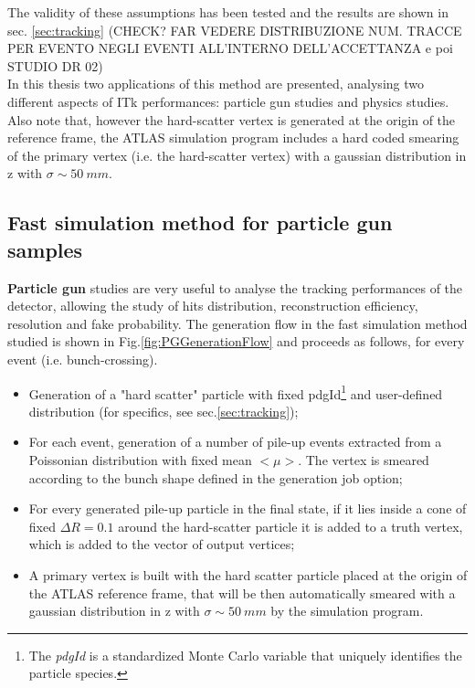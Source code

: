 \documentclass[a4paper,twoside,12pt]{article}
\begin{document}
The validity of these assumptions has been tested and the results are shown in sec.
\ref{sec:tracking} (CHECK? FAR VEDERE DISTRIBUZIONE NUM. TRACCE PER EVENTO 
NEGLI EVENTI ALL'INTERNO DELL'ACCETTANZA e poi STUDIO DR 02)\\

In this thesis two applications of this method are presented, analysing two different aspects
of ITk performances: particle gun studies and physics studies. \\

Also note that, however the hard-scatter vertex is generated at the origin of the reference
frame, the ATLAS simulation program includes a hard coded smearing of the primary vertex
(i.e. the hard-scatter vertex) with a gaussian distribution in z with $\sigma \sim 50\ mm$.

\subsection{Fast simulation method for particle gun samples}\label{sec:simulation:pg}

\textbf{Particle gun} studies are very useful to analyse the tracking performances of the
detector, allowing the study of hits distribution, reconstruction efficiency, resolution and
fake probability. The generation flow in the fast simulation method studied is shown in Fig.\ref{fig:PGGenerationFlow} and proceeds as follows,
for every event (i.e. bunch-crossing).\\
\begin{itemize}
\item Generation of a "hard scatter" particle with fixed pdgId\footnote{The \textit{pdgId} 
is a standardized Monte Carlo variable that uniquely identifies the particle species.} and 
user-defined distribution (for specifics, see sec.\ref{sec:tracking});
\item For each event, generation of a number of pile-up events extracted from a Poissonian
distribution with fixed mean $<\mu>$. The vertex is smeared according to the bunch shape
defined in the generation job option;
\item For every generated pile-up particle in the final state, if it lies inside a cone of fixed
$\Delta R = 0.1$ around the hard-scatter particle it is added to a truth vertex, which is added to the vector of output vertices;
\item A primary vertex is built with the hard scatter particle placed at the origin of the
ATLAS reference frame, that will be then automatically smeared with a gaussian distribution
in z with $\sigma \sim 50\ mm$ by the simulation program.
\end{itemize}
\end{document}
